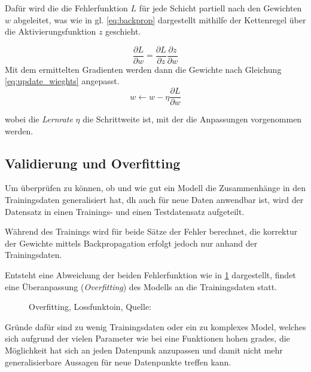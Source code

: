 Dafür wird die die Fehlerfunktion $L$ für jede Schicht partiell nach den 
Gewichten $w$ abgeleitet, was wie in gl. \ref{eq:backprop} dargestellt mithilfe der 
Kettenregel über die Aktivierungsfunktion $z$ geschieht.


\begin{equation}
    \label{eq:backprop}
    \frac{\partial L}{\partial w} = \frac{\partial L}{\partial z}\frac{\partial z}{\partial w}
\end{equation}
Mit dem ermittelten Gradienten werden dann die Gewichte nach Gleichung \ref{eq:update_wieghts} angepasst.
\begin{equation}
    \label{eq:update_wieghts}
    w  \leftarrow w - \eta \frac{\partial L}{\partial w}
\end{equation}

wobei die \textit{Lernrate} $\eta$ die Schrittweite ist, mit der die
Anpassungen vorgenommen werden.





\subsection{Validierung und Overfitting}\label{subsec:validation}

Um überprüfen zu können, ob und wie gut ein Modell die Zusammenhänge
in den Trainingsdaten generalisiert hat, dh auch für neue Daten
anwendbar ist,
wird der Datensatz in einen Trainings- und einen Testdatensatz aufgeteilt.

Während des Trainings wird für beide Sätze der Fehler berechnet, 
die korrektur der Gewichte mittels Backpropagation erfolgt
jedoch nur anhand der Trainingsdaten.

Entsteht eine Abweichung der beiden Fehlerfunktion wie in 
\ref{fig:overfitting} dargestellt, findet eine Überanpassung 
(\textit{Overfitting}) des Modells an die Trainingsdaten statt.

\begin{figure}[H]
    \centering
    \def\svgwidth{0.5\textwidth}
    
    \caption{Overfitting, Lossfunktoin, Quelle: \cite{overfittingPlot}}
    \label{fig:overfitting}
\end{figure}

Gründe dafür sind zu wenig Trainingsdaten oder ein zu komplexes Model, 
welches sich aufgrund der vielen Parameter wie bei eine Funktionen hohen
grades, die Möglichkeit hat sich an jeden Datenpunk 
anzupassen und damit nicht mehr generalisierbare Aussagen 
für neue Datenpunkte treffen kann.


